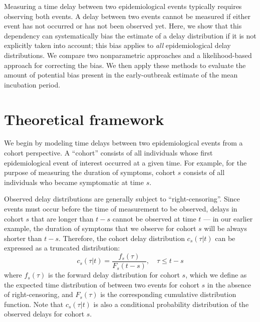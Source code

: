 \documentclass[12pt]{article}
\begin{document}
Measuring a time delay between two epidemiological events typically requires observing both events.
A delay between two events cannot be measured if either event has not occurred or has not been observed yet.
Here, we show that this dependency can systematically bias the estimate of a delay distribution if it is not explicitly taken into account;
this bias applies to \emph{all} epidemiological delay distributions.
We compare two nonparametric approaches and a likelihood-based approach for correcting the bias.
We then apply these methods to evaluate the amount of potential bias present in the early-outbreak estimate of the mean incubation period.

\section{Theoretical framework}

We begin by modeling time delays between two epidemiological events from a cohort perspective.
A ``cohort'' consists of all individuals whose first epidemiological event of interest occurred at a given time.
For example, for the purpose of measuring the duration of symptoms, cohort $s$ consists of all individuals who became symptomatic at time $s$.

Observed delay distributions are generally subject to ``right-censoring''.
Since events must occur before the time of measurement to be observed, delays in cohort $s$ that are longer than $t-s$ cannot be observed at time $t$ --- 
in our earlier example, the duration of symptoms that we observe for cohort $s$ will be always shorter than $t-s$.
Therefore, the cohort delay distribution $c_s(\tau|t)$ can be expressed as a truncated distribution:
\begin{equation}
c_s(\tau|t) = \frac{f_s(\tau)}{F_s(t-s)},\quad \tau \leq t-s
\label{eq:cohort}
\end{equation}
where $f_s(\tau)$ is the forward delay distribution for cohort $s$, which we define as the expected time distribution of between two events for cohort $s$ in the absence of right-censoring,
and $F_s(\tau)$ is the corresponding cumulative distribution function.
Note that $c_s(\tau|t)$ is also a conditional probability distribution of the observed delays for cohort $s$.
\end{document}

